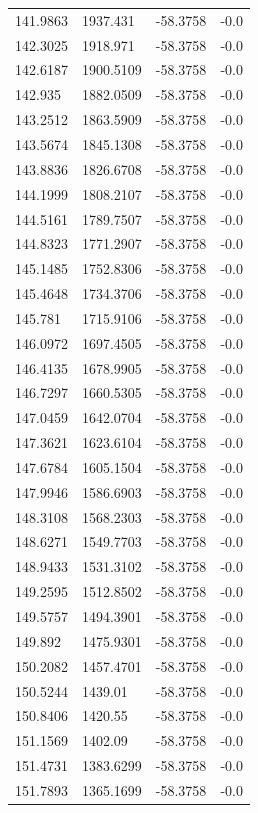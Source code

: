 \begin{table}[H]
\begin{tabular}{llll}
141.9863 & 1937.431 & -58.3758 & -0.0 \\
142.3025 & 1918.971 & -58.3758 & -0.0 \\
142.6187 & 1900.5109 & -58.3758 & -0.0 \\
142.935 & 1882.0509 & -58.3758 & -0.0 \\
143.2512 & 1863.5909 & -58.3758 & -0.0 \\
143.5674 & 1845.1308 & -58.3758 & -0.0 \\
143.8836 & 1826.6708 & -58.3758 & -0.0 \\
144.1999 & 1808.2107 & -58.3758 & -0.0 \\
144.5161 & 1789.7507 & -58.3758 & -0.0 \\
144.8323 & 1771.2907 & -58.3758 & -0.0 \\
145.1485 & 1752.8306 & -58.3758 & -0.0 \\
145.4648 & 1734.3706 & -58.3758 & -0.0 \\
145.781 & 1715.9106 & -58.3758 & -0.0 \\
146.0972 & 1697.4505 & -58.3758 & -0.0 \\
146.4135 & 1678.9905 & -58.3758 & -0.0 \\
146.7297 & 1660.5305 & -58.3758 & -0.0 \\
147.0459 & 1642.0704 & -58.3758 & -0.0 \\
147.3621 & 1623.6104 & -58.3758 & -0.0 \\
147.6784 & 1605.1504 & -58.3758 & -0.0 \\
147.9946 & 1586.6903 & -58.3758 & -0.0 \\
148.3108 & 1568.2303 & -58.3758 & -0.0 \\
148.6271 & 1549.7703 & -58.3758 & -0.0 \\
148.9433 & 1531.3102 & -58.3758 & -0.0 \\
149.2595 & 1512.8502 & -58.3758 & -0.0 \\
149.5757 & 1494.3901 & -58.3758 & -0.0 \\
149.892 & 1475.9301 & -58.3758 & -0.0 \\
150.2082 & 1457.4701 & -58.3758 & -0.0 \\
150.5244 & 1439.01 & -58.3758 & -0.0 \\
150.8406 & 1420.55 & -58.3758 & -0.0 \\
151.1569 & 1402.09 & -58.3758 & -0.0 \\
151.4731 & 1383.6299 & -58.3758 & -0.0 \\
151.7893 & 1365.1699 & -58.3758 & -0.0 \\

\end{tabular}
\end{table}
